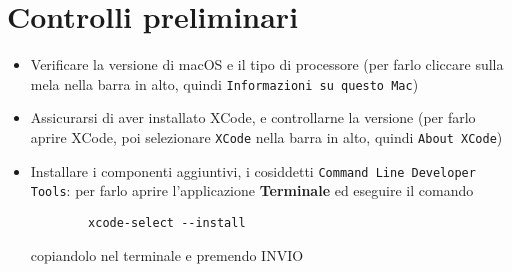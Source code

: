 

\section{Controlli preliminari}
\begin{itemize}
	\item Verificare la versione di macOS e il tipo di processore (per farlo cliccare sulla mela nella barra in alto, quindi \texttt{Informazioni su questo Mac})
	\item Assicurarsi di aver installato XCode, e controllarne la versione (per farlo aprire XCode, poi selezionare \texttt{XCode} nella barra in alto, quindi \texttt{About XCode})
	\item Installare i componenti aggiuntivi, i cosiddetti \texttt{Command Line Developer Tools}: per farlo aprire l'applicazione \textbf{Terminale} ed eseguire il comando 
	\begin{verbatim}
		xcode-select --install
	\end{verbatim}
	copiandolo nel terminale e premendo INVIO
\end{itemize}

